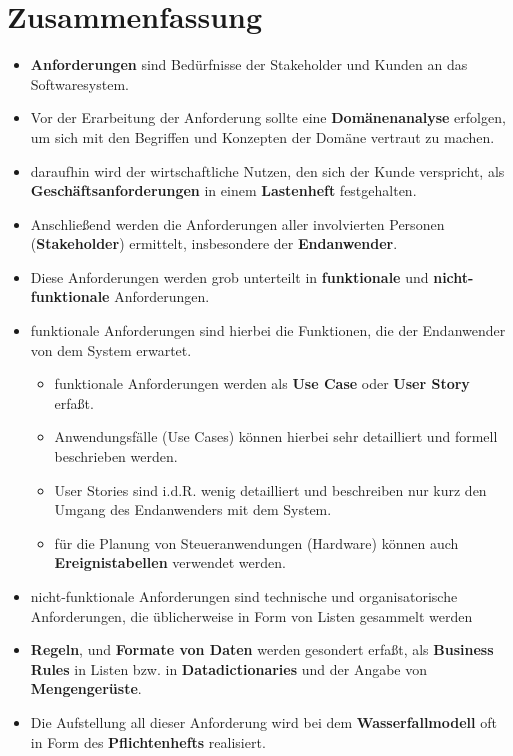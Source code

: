 \section{Zusammenfassung}



\begin{itemize}
    \item \textbf{Anforderungen} sind Bedürfnisse der Stakeholder und Kunden an das Softwaresystem.
    \item Vor der Erarbeitung der Anforderung sollte eine \textbf{Domänenanalyse} erfolgen, um sich mit den Begriffen und Konzepten der Domäne vertraut zu machen.
    \item daraufhin wird der wirtschaftliche Nutzen, den sich der Kunde verspricht, als \textbf{Geschäftsanforderungen} in einem \textbf{Lastenheft} festgehalten.
    \item Anschließend werden die Anforderungen aller involvierten Personen (\textbf{Stakeholder}) ermittelt, insbesondere der \textbf{Endanwender}.
    \item Diese Anforderungen werden grob unterteilt in \textbf{funktionale} und \textbf{nicht-funktionale} Anforderungen.
    \item funktionale Anforderungen sind hierbei die Funktionen, die der Endanwender von dem System erwartet.
        \begin{itemize}
            \item funktionale Anforderungen werden als \textbf{Use Case} oder \textbf{User Story} erfaßt.
            \item Anwendungsfälle (Use Cases) können hierbei sehr detailliert und formell beschrieben werden.
            \item User Stories sind i.d.R. wenig detailliert und beschreiben nur kurz den Umgang des Endanwenders mit dem System.
            \item für die Planung von Steueranwendungen (Hardware) können auch \textbf{Ereignistabellen} verwendet werden.
        \end{itemize}
    \item nicht-funktionale Anforderungen sind technische und organisatorische Anforderungen, die üblicherweise in Form von Listen gesammelt werden
    \item \textbf{Regeln}, und \textbf{Formate von Daten} werden gesondert erfaßt, als \textbf{Business Rules} in Listen bzw. in \textbf{Datadictionaries} und der Angabe von \textbf{Mengengerüste}.
    \item Die Aufstellung all dieser Anforderung wird bei dem \textbf{Wasserfallmodell} oft in Form des \textbf{Pflichtenhefts} realisiert.
\end{itemize}


